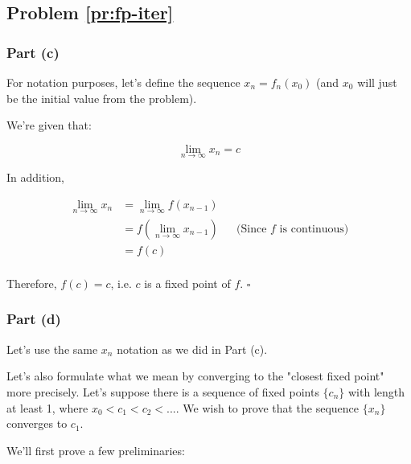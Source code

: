 \subsection{Problem \ref{pr:fp-iter}}

\subsubsection{Part (c)}

For notation purposes, let's define the sequence $x_n = f_n(x_0)$ (and $x_0$ will just be the initial value from the problem).

We're given that:

\begin{equation*}
\lim_{n \rightarrow \infty} x_n = c
\end{equation*}

In addition,

\begin{align*}
\lim_{n \rightarrow \infty} x_n &= \lim_{n \rightarrow \infty} f(x_{n-1}) \\
&= f(\lim_{n \rightarrow \infty} x_{n-1}) && \text{(Since $f$ is continuous)} \\
&= f(c) \\
\end{align*}


Therefore, $f(c) = c$, i.e. $c$ is a fixed point of $f$. $\square$

\subsubsection{Part (d)}

Let's use the same $x_n$ notation as we did in Part (c). 

Let's also formulate what we mean by converging to the "closest fixed point" more precisely. Let's suppose there is a sequence of fixed points $\{c_n\}$ with length at least 1, where $x_0 < c_1 < c_2 < ...$. We wish to prove that the sequence $\{x_n\}$ converges to $c_1$.

We'll first prove a few preliminaries:

